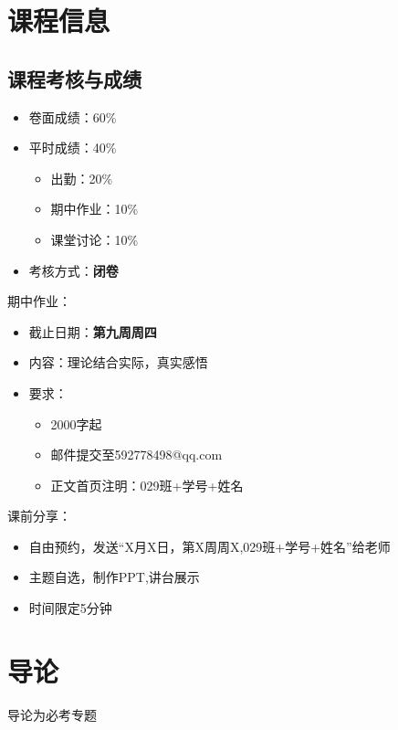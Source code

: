 \section{课程信息}%
\label{sec:课程信息}
\subsection{课程考核与成绩}%
\label{sub:课程考核与成绩}
\begin{itemize}
    \item 卷面成绩：60\%
    \item 平时成绩：40\%
        \begin{itemize}
            \item 出勤：20\%
            \item 期中作业：10\%
            \item 课堂讨论：10\%
            
        \end{itemize}
    \item 考核方式：\textbf{闭卷}
    
\end{itemize}
\begin{notation}
期中作业：

\begin{itemize}
    \item 截止日期：\textbf{第九周周四}
    \item 内容：理论结合实际，真实感悟
    \item 要求：
        \begin{itemize}
            \item 2000字起
            \item 邮件提交至592778498@qq.com
            \item 正文首页注明：029班+学号+姓名
            
        \end{itemize}
\end{itemize}
课前分享：
\begin{itemize}
    \item 自由预约，发送“X月X日，第X周周X,029班+学号+姓名”给老师
    \item 主题自选，制作PPT,讲台展示
    \item 时间限定5分钟
        
\end{itemize}
\end{notation}
\section{导论}%
\label{sec:导论}
导论为必考专题
